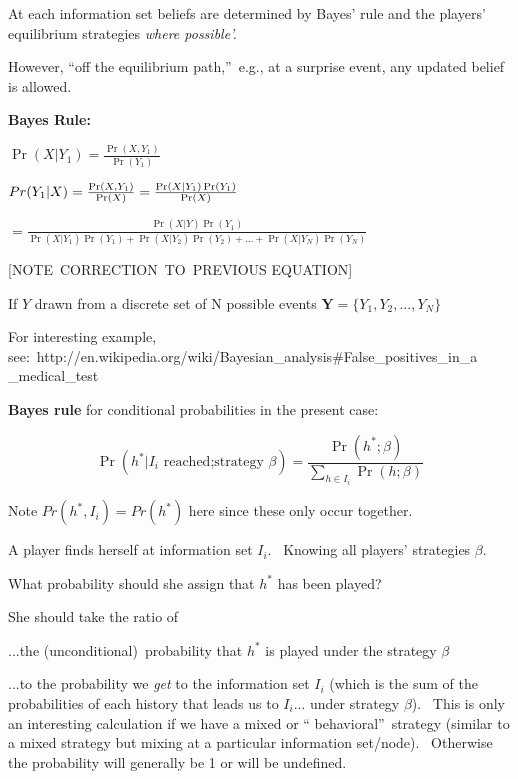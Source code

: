 \documentclass{article}
\begin{document}
At each information set beliefs are determined by Bayes' rule and the
players' equilibrium strategies \textit{where possible'.}

However, \textquotedblleft off the equilibrium path,\textquotedblright\
e.g., at a surprise event, any updated belief is allowed.\bigskip

\textbf{Bayes Rule:}

$\Pr (X|Y_{1})=\frac{\Pr (X,Y_{1})}{\Pr (Y_{1})}$

\bigskip

$Pr(Y_{1}|X)=\frac{\Pr (X,Y_{1})}{\Pr (X)}=\frac{\Pr (X|Y_{1})\Pr (Y_{1})}{%
\Pr (X)}$

$=\frac{\Pr (X|Y)\Pr (Y_{1})}{\Pr (X|Y_{1})\Pr (Y_{1})+\Pr (X|Y_{2})\Pr
(Y_{2})+...+\Pr (X|Y_{N})\Pr (Y_{N})}$

\bigskip

[NOTE\ CORRECTION\ TO\ PREVIOUS EQUATION]

If $Y$ drawn from a discrete set of N possible events $\mathbf{Y=}%
\{Y_{1},Y_{2},...,Y_{N}\}$

\bigskip

For interesting example, see:\
http://en.wikipedia.org/wiki/Bayesian\_analysis\#False\_positives\_in\_a%
\_medical\_test\bigskip

\bigskip

\bigskip

\textbf{Bayes rule} for conditional probabilities in the present case:

\[
\Pr (h^{\ast }|I_{i}\text{ reached;strategy }\beta )=\frac{\Pr (h^{\ast
};\beta )}{\sum\limits_{h\in I_{i}}\Pr (h;\beta )} 
\]

Note $Pr(h^{\ast },I_{i})=Pr(h^{\ast })$ here since these only occur
together.

A player finds herself at information set $I_{i}$. \ Knowing all players'
strategies $\beta $. \ 

What probability should she assign that $h^{\ast }$ has been played? \ 

She should take the ratio of

...the (unconditional)\ probability that $h^{\ast }$ is played under the
strategy $\beta $ \ 

...to the probability we \textit{get }to the information set $I_{i}$ (which
is the sum of the probabilities of each history that leads us to $I_{i}$...
under strategy $\beta $). \ {\footnotesize This is only an interesting
calculation if we have a mixed or \textquotedblleft
behavioral\textquotedblright\ strategy (similar to a mixed strategy but
mixing at a particular information set/node). \ Otherwise the probability
will generally be 1 or will be undefined.}
\end{document}
